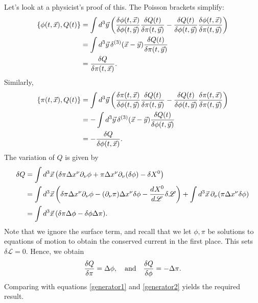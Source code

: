\documentclass{article}
\begin{document}
\par
Let's look at a physicist's proof of this. The Poisson brackets simplify:
\begin{align}
	\begin{split} \label{generator1}
	\{\phi(t, \vec{x}), Q(t)\} &= \int \dd[3]{\vec{y}} \qty( \fdv{\phi(t,\vec{x})}{\phi(t,\vec{y})} \fdv{Q(t)}{\pi(t,\vec{y})} - \fdv{Q(t)}{\phi(t,\vec{y})} \fdv{\phi(t,\vec{x})}{\pi(t,\vec{y})}) \\
	&= \int \dd[3]{\vec{y}} \delta^{(3)}(\vec{x} - \vec{y}) \fdv{Q(t)}{\pi(t,\vec{y})}  \\
	&= \fdv{Q}{\pi(t, \vec{x})}.
	\end{split}
\end{align}
Similarly,
\begin{align}
	\begin{split} \label{generator2}
	\{\pi(t, \vec{x}), Q(t)\} &= \int \dd[3]{\vec{y}} \qty( \fdv{\pi(t,\vec{x})}{\phi(t,\vec{y})} \fdv{Q(t)}{\pi(t,\vec{y})} - \fdv{Q(t)}{\phi(t,\vec{y})} \fdv{\pi(t,\vec{x})}{\pi(t,\vec{y})}) \\
	&= - \int \dd[3]{\vec{y}} \delta^{(3)}(\vec{x} - \vec{y}) \fdv{Q(t)}{\phi(t,\vec{y})}  \\
	&= -\fdv{Q}{\phi(t, \vec{x})}.
	\end{split}
\end{align}
The variation of $ Q $ is given by
\begin{align}
	\begin{split}
	\delta Q &= \int \dd[3]{\vec{x}} \qty(\delta \pi \Delta x^{\nu} \partial_{\nu} \phi + \pi \Delta x^{\nu} \partial_{\nu} (\delta \phi )- \delta X^{0}) \\
	&= \int \dd[3]{\vec{x}} \qty(\delta \pi \Delta x^{\nu} \partial_{\nu} \phi - (\partial_{\nu} \pi) \Delta x^{\nu} \delta \phi - \frac{d^{} X^{0}}{d\mathscr{L}^{}} \delta \mathscr{L}) + \int \dd[3]{\vec{x}} \partial_{\nu} \qty(\pi \Delta x^{\nu} \delta \phi) \\
	&= \int \dd[3]{\vec{x}} \qty(\delta \pi \Delta \phi - \delta \phi \Delta \pi).
	\end{split}
\end{align}
Note that we ignore the surface term, and recall that we let $ \phi, \pi $ be solutions to equations of motion to obtain the conserved current in the first place. This sets $ \delta \mathscr{L} = 0 $. Hence, we obtain
\begin{equation}
	\fdv{Q}{\pi} = \Delta \phi, \qq{and} \fdv{Q}{\phi} = - \Delta \pi.
\end{equation}
Comparing with equations \eqref{generator1} and \eqref{generator2} yields the required result.
\end{document}
